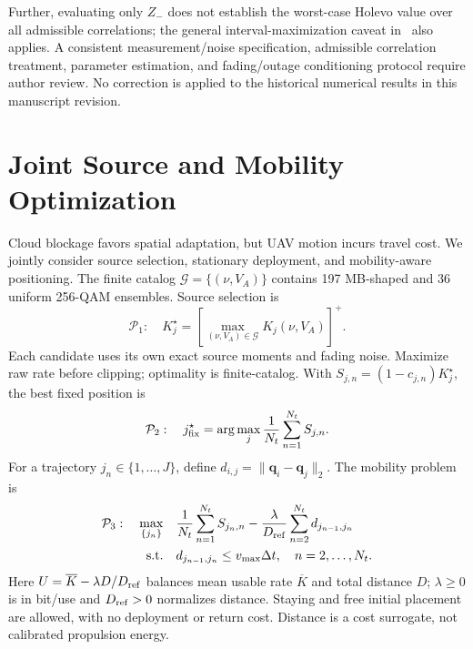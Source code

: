 \documentclass[conference,a4paper]{IEEEtran}
\begin{document}
Further, evaluating only $Z_-$ does not establish the worst-case
Holevo value over all admissible correlations; the general
interval-maximization caveat in~\cite[Sec.~4, footnotes 11--12]{denys2021}
also applies. A consistent measurement/noise specification, admissible
correlation treatment, parameter estimation, and fading/outage
conditioning protocol require author review. No correction is applied
to the historical numerical results in this manuscript revision.


\raggedbottom
\section{Joint Source and Mobility Optimization}
\label{sec:optimization}
Cloud blockage favors spatial adaptation, but UAV motion incurs travel
cost. We jointly consider source selection, stationary deployment, and
mobility-aware positioning.
The finite catalog $\mathcal G=\{(\nu,V_A)\}$ contains 197 MB-shaped and
36 uniform 256-QAM ensembles. Source selection is
\begin{equation}
 \mathcal P_1:\quad K_j^\star=
 \left[\max_{(\nu,V_A)\in\mathcal G}K_j(\nu,V_A)\right]^+.
 \label{eq:p1}
\end{equation}
Each candidate uses its own exact source moments and fading noise.
Maximize raw rate before clipping; optimality is finite-catalog.
With $S_{j,n}=(1-c_{j,n})K_j^\star$, the best fixed position is
\begin{equation}
 \mathcal P_2:\quad j_{\rm fix}^\star=
 \arg\max_j\frac{1}{N_t}\sum_{n=1}^{N_t}S_{j,n}.
 \label{eq:p2}
\end{equation}
For a trajectory $j_n\in\{1,\ldots,J\}$, define
$d_{i,j}=\|\mathbf q_i-\mathbf q_j\|_2$. The mobility problem is
\begin{align}
 \mathcal P_3:\quad\max_{\{j_n\}}\quad&
 \frac{1}{N_t}\sum_{n=1}^{N_t}S_{j_n,n}
 -\frac{\lambda}{D_{\rm ref}}\sum_{n=2}^{N_t}d_{j_{n-1},j_n}
 \label{eq:p3}\\
 \mathrm{s.t.}\quad&d_{j_{n-1},j_n}\le v_{\max}\Delta t,
                  \quad n=2,\ldots,N_t.\nonumber
\end{align}
Here $U=\overline K-\lambda D/D_{\rm ref}$ balances mean usable rate
$\overline K$ and total distance $D$; $\lambda\ge0$ is in bit/use and
$D_{\rm ref}>0$ normalizes distance. Staying and free initial placement
are allowed, with no deployment or return cost. Distance is a cost
surrogate, not calibrated propulsion energy.
\end{document}
